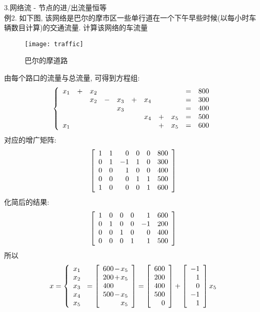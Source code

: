 3.网络流 - 节点的进/出流量恒等\\
例2. 如下图, 该网络是巴尔的摩市区一些单行道在一个下午早些时候(以每小时车辆数目计算)的交通流量. 计算该网络的车流量\\
\begin{figure}[H]
\texttt{[image: traffic]}
\caption{巴尔的摩道路}
\end{figure}
由每个路口的流量与总流量, 可得到方程组:
\[
\left\{\begin{array}{r r r r r r r r r r r}
    x_1 & + & x_2 & & & & & & & = & 800\\
    & & x_2 & - & x_3 & + & x_4 & & & = & 300\\
    & & & & x_3 & & & & & = & 400\\
    & & & & & & x_4 & + & x_5 & = & 500\\
    x_1 & & & & & & & + & x_5 & = & 600
\end{array}\right.
\]
对应的增广矩阵:
\[
\left[\begin{array}{r r r r r r}
    1 & 1 & 0 & 0 & 0 & 800\\
    0 & 1 & -1 & 1 & 0 & 300\\
    0 & 0 & 1 & 0 & 0 & 400\\
    0 & 0 & 0 & 1 & 1 & 500\\
    1 & 0 & 0 & 0 & 1 & 600
\end{array}\right]
\]
化简后的结果:
\[
\left[\begin{array}{r r r r r r}
    1 & 0 & 0 & 0 & 1 & 600\\
    0 & 1 & 0 & 0 & -1 & 200\\
    0 & 0 & 1 & 0 & 0 & 400\\
    0 & 0 & 0 & 1 & 1 & 500
\end{array}\right]
\]
所以
\[
x=\left\{\begin{array}{c}
    x_1\\
    x_2\\
    x_3\\
    x_4\\
    x_5
\end{array}\right.=\left[\begin{array}{r@{\hspace{1pt}}r@{\hspace{1pt}}r}
    600 & - & x_5\\
    200 & + & x_5\\
    400 & &\\
    500 & - & x_5\\
    & & x_5
\end{array}\right]=\left[\begin{array}{r}
    600\\
    200\\
    400\\
    500\\
    0
\end{array}\right]+\left[\begin{array}{r}
    -1\\
    1\\
    0\\
    -1\\
    1
\end{array}\right]x_5
\]\\[4ex]

